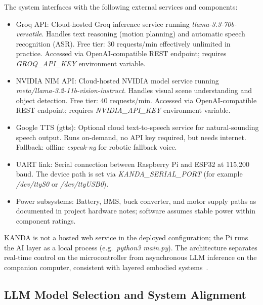 The system interfaces with the following external services and components:

\begin{itemize}[nosep]
  \item Groq API: Cloud-hosted Groq inference service running \textit{llama-3.3-70b-versatile}. Handles text reasoning (motion planning) and automatic speech recognition (ASR). Free tier: 30 requests/min effectively unlimited in practice. Accessed via OpenAI-compatible REST endpoint; requires \textit{GROQ\_API\_KEY} environment variable.

  \item NVIDIA NIM API: Cloud-hosted NVIDIA model service running \textit{meta/llama-3.2-11b-vision-instruct}. Handles visual scene understanding and object detection. Free tier: 40 requests/min. Accessed via OpenAI-compatible REST endpoint; requires \textit{NVIDIA\_API\_KEY} environment variable.

  \item Google TTS (gtts): Optional cloud text-to-speech service for natural-sounding speech output. Runs on-demand, no API key required, but needs internet. Fallback: offline \textit{espeak-ng} for robotic fallback voice.

  \item UART link: Serial connection between Raspberry Pi and ESP32 at 115,200 baud. The device path is set via \textit{KANDA\_SERIAL\_PORT} (for example \textit{/dev/ttyS0} or \textit{/dev/ttyUSB0}).

  \item Power subsystems: Battery, BMS, buck converter, and motor supply paths as documented in project hardware notes; software assumes stable power within component ratings.
\end{itemize}

KANDA is not a hosted web service in the deployed configuration; the Pi runs the AI layer as a local process (e.g.\ \textit{python3 main.py}). The architecture separates real-time control on the microcontroller from asynchronous LLM inference on the companion computer, consistent with layered embodied systems~\cite{brooks1986robust,driess2023palme}.

\subsection{LLM Model Selection and System Alignment}
\label{subsec:alignment}

